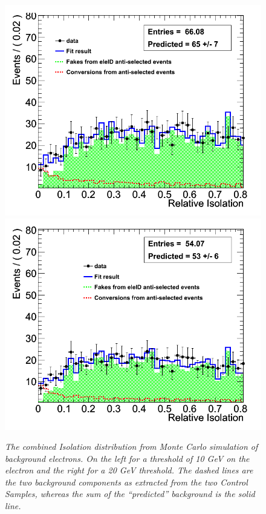 \begin{figure}[h!]
\centering
\includegraphics[scale=0.32]{Plots/combIso_pt10_fit.png}
\includegraphics[scale=0.32]{Plots/combIso_pt20_fit.png}
\caption{\textit{The combined Isolation distribution from Monte Carlo simulation of background electrons. On the left for a threshold of 10 GeV on the electron and the right for a 20 GeV threshold.  The dashed lines are the two background components as extracted from the two Control Samples, whereas the sum of the ``predicted'' background is the solid line.}}\label{fig:combIso_fit}
\end{figure}

